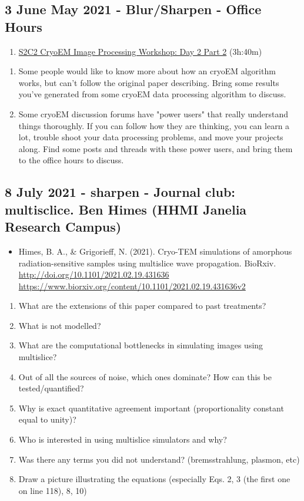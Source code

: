 \documentclass[11pt, oneside]{article}   	%
\begin{document}
\subsection{3 June May 2021 - Blur/Sharpen - Office Hours}
\begin{enumerate}
	\item \href{https://youtu.be/HXIipHORI2Y}{S2C2 CryoEM Image Processing Workshop: Day 2 Part 2} (3h:40m)
	\end{enumerate}
\begin{enumerate}
	\item Some people would like to know more about how an cryoEM algorithm works, but can't follow the original paper describing. Bring some results you've generated from some cryoEM data processing algorithm to discuss.
	\item Some cryoEM discussion forums have "power users" that really understand things thoroughly. If you can follow how they are thinking, you can learn a lot, trouble shoot your data processing problems, and move your projects along. Find some posts and threads with these power users, and bring them to the office hours to discuss.
\end{enumerate}

\subsection{8 July 2021 - sharpen - Journal club: multisclice. Ben Himes (HHMI Janelia Research Campus)}
\begin{itemize}
	\item Himes, B. A., \& Grigorieff, N. (2021). Cryo-TEM simulations of amorphous radiation-sensitive samples using multislice wave propagation. BioRxiv. 
	\\ \url{http://doi.org/10.1101/2021.02.19.431636}
	\\ \url{https://www.biorxiv.org/content/10.1101/2021.02.19.431636v2}
\end{itemize}
\begin{enumerate}
	\item What are the extensions of this paper compared to past treatments?
	\item What is not modelled?
	\item What are the computational bottlenecks in simulating images using multislice?
	\item Out of all the sources of noise, which ones dominate? How can this be tested/quantified?
	\item Why is exact quantitative agreement important (proportionality constant equal to unity)?
	\item Who is interested in using multislice simulators and why?
	\item Was there any terms you did not understand? (bremsstrahlung, plasmon, etc)
	\item Draw a picture illustrating the equations (especially Eqs. 2, 3 (the first one on line 118), 8, 10)
\end{enumerate}
\end{document}
